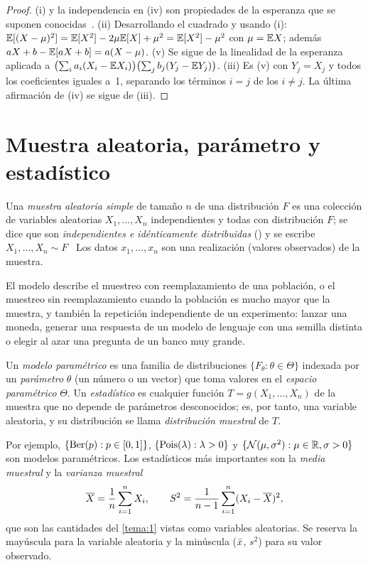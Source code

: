 \begin{proof}
(i) y la independencia en (iv) son propiedades de la esperanza que se suponen conocidas~\cite[§4.2 y §7.3]{bh}. (ii) Desarrollando el cuadrado y usando (i): $\mathbb{E}[(X-\mu)^{2}]=\mathbb{E}[X^{2}]-2\mu\mathbb{E}[X]+\mu^{2}=\mathbb{E}[X^{2}]-\mu^{2}$ con $\mu=\mathbb{E} X$; además $aX+b-\mathbb{E}[aX+b]=a(X-\mu)$. (v) Se sigue de la linealidad de la esperanza aplicada a $\bigl(\sum_ia_i(X_i-\mathbb{E} X_i)\bigr)\bigl(\sum_jb_j(Y_j-\mathbb{E} Y_j)\bigr)$. (iii) Es (v) con $Y_j=X_j$ y todos los coeficientes iguales a~1, separando los términos $i=j$ de los $i\neq j$. La última afirmación de (iv) se sigue de (iii).
\end{proof}

\section{Muestra aleatoria, parámetro y estadístico}

\begin{definicion}\label{def:t2-mas}
Una \emph{muestra aleatoria simple} de tamaño $n$ de una distribución $F$ es una colección de variables aleatorias $X_1,\dots,X_n$ independientes y todas con distribución $F$; se dice que son \emph{independientes e idénticamente distribuidas} (\iid) y se escribe $X_1,\dots,X_n\sim F$ \iid\ Los datos $x_1,\dots,x_n$ son una realización (valores observados) de la muestra.
\end{definicion}

El modelo describe el muestreo con reemplazamiento de una población, o el muestreo sin reemplazamiento cuando la población es mucho mayor que la muestra, y también la repetición independiente de un experimento: lanzar una moneda, generar una respuesta de un modelo de lenguaje con una semilla distinta o elegir al azar una pregunta de un banco muy grande.

\begin{definicion}\label{def:t2-parametro}
Un \emph{modelo paramétrico} es una familia de distribuciones $\{F_\theta:\theta\in\Theta\}$ indexada por un \emph{parámetro} $\theta$ (un número o un vector) que toma valores en el \emph{espacio paramétrico} $\Theta$. Un \emph{estadístico} es cualquier función $T=g(X_1,\dots,X_n)$ de la muestra que no depende de parámetros desconocidos; es, por tanto, una variable aleatoria, y su distribución se llama \emph{distribución muestral} de $T$.
\end{definicion}

Por ejemplo, $\{\operatorname{Ber}(p):p\in[0,1]\}$, $\{\operatorname{Pois}(\lambda):\lambda>0\}$ y $\{\mathcal{N}(\mu,\sigma^{2}):\mu\in\mathbb{R},\sigma>0\}$ son modelos paramétricos. Los estadísticos más importantes son la \emph{media muestral} y la \emph{varianza muestral}
\[
\overline{X}=\frac1n\sum_{i=1}^{n}X_i,\qquad S^{2}=\frac{1}{n-1}\sum_{i=1}^{n}(X_i-\overline{X})^{2},
\]
que son las cantidades del \cref{tema:1} vistas como variables aleatorias. Se reserva la mayúscula para la variable aleatoria y la minúscula ($\bar{x}$, $s^{2}$) para su valor observado.

